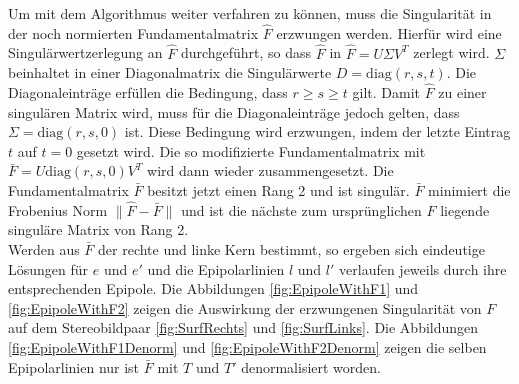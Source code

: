
Um mit dem Algorithmus weiter verfahren zu können, muss die Singularität in der noch normierten Fundamentalmatrix $\hat{F}$ erzwungen werden\cite{HZ}. Hierfür wird eine Singulärwertzerlegung an $\hat{F}$ durchgeführt, so dass $\hat{F}$ in $\hat{F} = U\Sigma V^T$ zerlegt wird. $\Sigma$ beinhaltet in einer Diagonalmatrix die Singulärwerte $D = \text{diag}(r,s,t)$. Die Diagonaleinträge erfüllen die Bedingung, dass $r \geq s \geq t $ gilt. Damit $\hat{F}$ zu einer singulären Matrix wird, muss für die Diagonaleinträge jedoch gelten, dass  $\Sigma = \text{diag}(r,s,0)$ ist. Diese Bedingung wird erzwungen, indem der letzte Eintrag $t$ auf $t = 0$ gesetzt wird. Die so modifizierte Fundamentalmatrix mit $\bar{F} = U\text{diag}(r,s,0)V^T$ wird dann wieder zusammengesetzt. Die Fundamentalmatrix $\bar{F}$ besitzt jetzt einen Rang 2 und ist singulär\cite{HZ}. $\bar{F}$ minimiert die Frobenius Norm $\parallel \hat{F} -\bar{F} \parallel$ und ist die nächste zum ursprünglichen $F$ liegende singuläre Matrix von Rang 2\cite{HZ,HZ8,FormelsammlungMatrizen}. \\

Werden aus $\bar{F}$ der rechte und linke Kern bestimmt, so ergeben sich eindeutige Lösungen für $e$ und $e'$ und die Epipolarlinien $l$ und $l'$ verlaufen jeweils durch ihre entsprechenden Epipole\cite{HZ}. Die Abbildungen \ref{fig:EpipoleWithF1} und \ref{fig:EpipoleWithF2} zeigen die Auswirkung der erzwungenen Singularität von $F$ auf dem Stereobildpaar \ref{fig:SurfRechts} und \ref{fig:SurfLinks}. Die Abbildungen \ref{fig:EpipoleWithF1Denorm} und \ref{fig:EpipoleWithF2Denorm} zeigen die selben Epipolarlinien nur ist $\bar{F}$ mit $T$ und $T'$ denormalisiert worden.\\



% 

